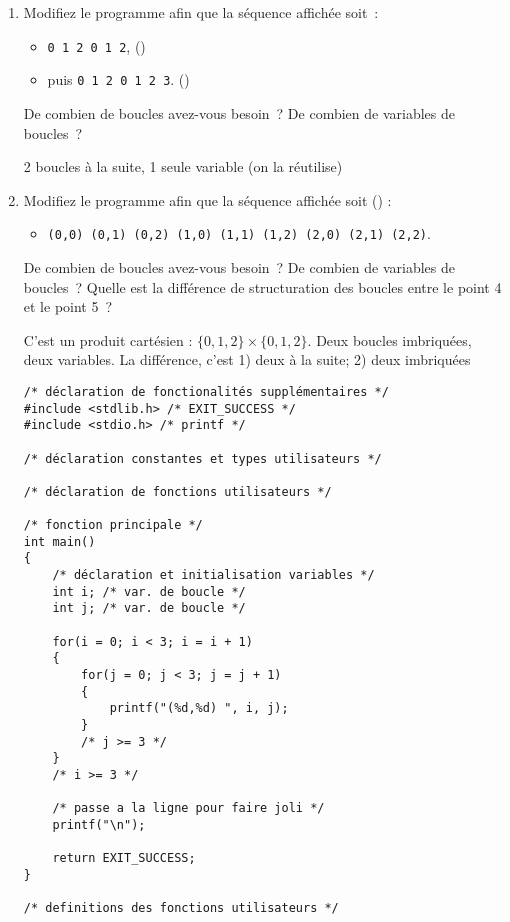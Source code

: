 \begin{enumerate}
\begin{correction}
  \end{correction}
\item Modifiez le programme afin que la séquence affichée soit~:
  \begin{itemize}
  \item \verb|0 1 2 0 1 2|, ()
  \item puis \verb|0 1 2 0 1 2 3|. ()
  \end{itemize}
  De combien de boucles avez-vous besoin~? De combien de variables de
  boucles~?

  \begin{correction}
    2 boucles à la suite, 1 seule variable (on la réutilise)
  \end{correction}

\item Modifiez le programme afin que la séquence affichée soit
  () :
  \begin{itemize}
  \item \verb|(0,0) (0,1) (0,2) (1,0) (1,1) (1,2) (2,0) (2,1) (2,2)|.
  \end{itemize}

  De combien de boucles avez-vous besoin~? De combien de variables de
  boucles~? Quelle est la différence de structuration
  des boucles entre le point 4 et le point 5~?

  \begin{correction}
    C'est un produit cartésien : $\{0,1,2\} \times \{0,1,2\}$. Deux boucles
    imbriquées, deux variables. La différence, c'est 1) deux à la suite; 2)
    deux imbriquées

\begin{verbatim}
/* déclaration de fonctionalités supplémentaires */
#include <stdlib.h> /* EXIT_SUCCESS */
#include <stdio.h> /* printf */

/* déclaration constantes et types utilisateurs */

/* déclaration de fonctions utilisateurs */

/* fonction principale */
int main()
{
    /* déclaration et initialisation variables */
    int i; /* var. de boucle */
    int j; /* var. de boucle */

    for(i = 0; i < 3; i = i + 1)
    {
        for(j = 0; j < 3; j = j + 1)
        {
            printf("(%d,%d) ", i, j);
        }
        /* j >= 3 */
    }
    /* i >= 3 */

    /* passe a la ligne pour faire joli */
    printf("\n");

    return EXIT_SUCCESS;
}

/* definitions des fonctions utilisateurs */
\end{verbatim}
\end{correction}

\end{enumerate}

